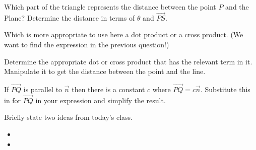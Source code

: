 \begin{problem}
\begin{subproblem}
    \item Which part of the triangle represents the distance between the point $P$ and the Plane?
       Determine the distance in terms of $\theta$ and $\overrightarrow{PS}$.
      \vfill

    \item Which is more appropriate to use here a dot product or a cross product. (We want to find the expression in the previous question!)
      \vspace{3em}

    \item Determine the appropriate dot or cross product that has the relevant term in it. Manipulate it to get the distance between the point and the line.
      \vfill

    \item If $\overrightarrow{PQ}$ is parallel to $\vec{n}$ then there is a constant $c$ where $\overrightarrow{PQ}=c\vec{n}$.
      Substitute this in for $\overrightarrow{PQ}$ in your expression and simplify the result.

      \vfill
  \end{subproblem}
\end{problem}


\postClass

\begin{problem}
\item Briefly state two ideas from today's class.
  \begin{itemize}
  \item
  \item
  \end{itemize}
\item
  \begin{subproblem}
    \item
  \end{subproblem}
\end{problem}




